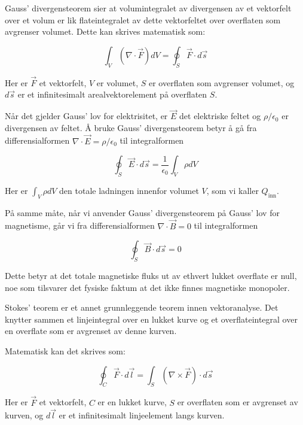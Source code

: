Gauss' divergensteorem sier at volumintegralet av divergensen av et vektorfelt over et volum er lik flateintegralet av dette vektorfeltet over overflaten som avgrenser volumet. Dette kan skrives matematisk som:

\begin{equation*}
\int_V (\nabla \cdot \vec{F}) dV = \oint_S \vec{F} \cdot d\vec{s}
\end{equation*}

Her er $\vec{F}$ et vektorfelt, $V$ er volumet, $S$ er overflaten som avgrenser volumet, og $d\vec{s}$ er et infinitesimalt arealvektorelement på overflaten $S$.

Når det gjelder Gauss' lov for elektrisitet, er $\vec{E}$ det elektriske feltet og $\rho/\epsilon_0$ er divergensen av feltet. Å bruke Gauss' divergensteorem betyr å gå fra differensialformen $\nabla \cdot \vec{E} = \rho/\epsilon_0$ til integralformen

\begin{equation*}
\oint_S \vec{E} \cdot d\vec{s} = \frac{1}{\epsilon_0}\int_V \rho dV
\end{equation*}

Her er $\int_V \rho dV$ den totale ladningen innenfor volumet $V$, som vi kaller $Q_{\text{inn}}$.

På samme måte, når vi anvender Gauss' divergensteorem på Gauss' lov for magnetisme, går vi fra differensialformen $\nabla \cdot \vec{B} = 0$ til integralformen

\begin{equation*}
\oint_S \vec{B} \cdot d\vec{s} = 0
\end{equation*}

Dette betyr at det totale magnetiske fluks ut av ethvert lukket overflate er null, noe som tilsvarer det fysiske faktum at det ikke finnes magnetiske monopoler.

Stokes' teorem er et annet grunnleggende teorem innen vektoranalyse. Det knytter sammen et linjeintegral over en lukket kurve og et overflateintegral over en overflate som er avgrenset av denne kurven.

Matematisk kan det skrives som:

\begin{equation*}
\oint_C \vec{F} \cdot d\vec{l} = \int_S (\nabla \times \vec{F}) \cdot d\vec{s}
\end{equation*}

Her er $\vec{F}$ et vektorfelt, $C$ er en lukket kurve, $S$ er overflaten som er avgrenset av kurven, og $d\vec{l}$ er et infinitesimalt linjeelement langs kurven.

